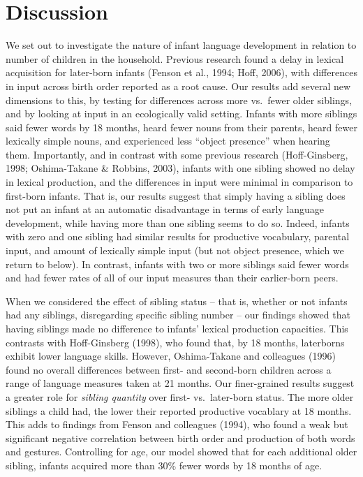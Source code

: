 \documentclass[man,floatsintext]{apa6}
\begin{document}
\hypertarget{discussion}{%
\section{Discussion}\label{discussion}}

We set out to investigate the nature of infant language development in relation to number of children in the household. Previous research found a delay in lexical acquisition for later-born infants (Fenson et al., 1994; Hoff, 2006), with differences in input across birth order reported as a root cause. Our results add several new dimensions to this, by testing for differences across more vs.~fewer older siblings, and by looking at input in an ecologically valid setting. Infants with more siblings said fewer words by 18 months, heard fewer nouns from their parents, heard fewer lexically simple nouns, and experienced less \enquote{object presence} when hearing them.
Importantly, and in contrast with some previous research (Hoff-Ginsberg, 1998; Oshima-Takane \& Robbins, 2003), infants with one sibling showed no delay in lexical production, and the differences in input were minimal in comparison to first-born infants. That is, our results suggest that simply having a sibling does not put an infant at an automatic disadvantage in terms of early language development, while having more than one sibling seems to do so. Indeed, infants with zero and one sibling had similar results for productive vocabulary, parental input, and amount of lexically simple input (but not object presence, which we return to below). In contrast, infants with two or more siblings said fewer words and had fewer rates of all of our input measures than their earlier-born peers.

When we considered the effect of sibling status -- that is, whether or not infants had any siblings, disregarding specific sibling number -- our findings showed that having siblings made no difference to infants' lexical production capacities. This contrasts with Hoff-Ginsberg (1998), who found that, by 18 months, laterborns exhibit lower language skills. However, Oshima-Takane and colleagues (1996) found no overall differences between first- and second-born children across a range of language measures taken at 21 months. Our finer-grained results suggest a greater role for \emph{sibling quantity} over first- vs.~later-born status. The more older siblings a child had, the lower their reported productive vocablary at 18 months. This adds to findings from Fenson and colleagues (1994), who found a weak but significant negative correlation between birth order and production of both words and gestures. Controlling for age, our model showed that for each additional older sibling, infants acquired more than 30\% fewer words by 18 months of age.
\end{document}
